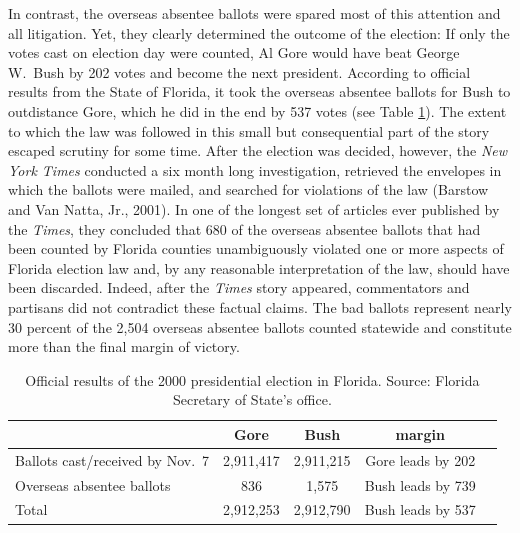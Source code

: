 \documentclass[11pt,titlepage]{article}
\begin{document}
In contrast, the overseas absentee ballots were spared most of this
attention and all litigation.  Yet, they clearly determined the
outcome of the election: If only the votes cast on election day were
counted, Al Gore would have beat George W.\ Bush by 202 votes and
become the next president.  According to official results from the
State of Florida, it took the overseas absentee ballots for Bush to
outdistance Gore, which he did in the end by 537 votes (see Table
\ref{tb:official}).  The extent to which the law was followed in this
small but consequential part of the story escaped scrutiny for some
time. After the election was decided, however, the \emph{New York
  Times} conducted a six month long investigation, retrieved the
envelopes in which the ballots were mailed, and searched for
violations of the law (Barstow and Van Natta, Jr., 2001).  In one of
the longest set of articles ever published by the \emph{Times}, they
concluded that 680 of the overseas absentee ballots that had been
counted by Florida counties unambiguously violated one or more aspects
of Florida election law and, by any reasonable interpretation of the
law, should have been discarded.  Indeed, after the \emph{Times} story
appeared, commentators and partisans did not contradict these factual
claims.  The bad ballots represent nearly 30 percent of the 2,504
overseas absentee ballots counted statewide and constitute more than
the final margin of victory.
\begin{table}[t]
\begin{center}
\begin{tabular}{lcccc}
                               & Gore      & Bush      & margin \\ \hline 
Ballots cast/received by Nov.\ 7&2,911,417 & 2,911,215 & Gore leads by 202 \\
Overseas absentee ballots       &      836 &     1,575 & Bush leads by 739 \\
\hline
Total                          & 2,912,253 & 2,912,790 & Bush leads by 537 \\
\end{tabular} \caption{Official results of the 2000 presidential
  election in Florida.  Source: Florida Secretary of State's office.}
\label{tb:official}
\end{center}
\end{table} 
\end{document}
